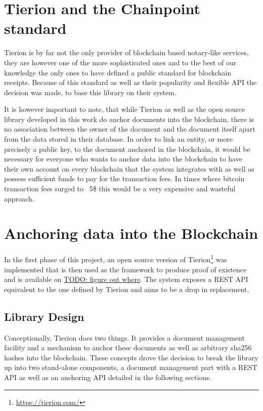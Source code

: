 \documentclass[12pt,msc,a4paper,oneside]{ucl_thesis}
\begin{document}
\section{Tierion and the Chainpoint standard}
Tierion is by far not the only provider of blockchain based notary-like services, they are however one of the more sophisticated ones and to the best of our knowledge the only ones to have defined a public standard for blockchain receipts. Because of this standard as well as their popularity and flexible API the decision was made, to base this library on their system.

It is however important to note, that while Tierion as well as the open source library developed in this work do anchor documents into the blockchain, there is no association between the owner of the document and the document itself apart from the data stored in their database. In order to link an entity, or more precisely a public key, to the document anchored in the blockchain, it would be necessary for everyone who wants to anchor data into the blockchain to have their own account on every blockchain that the system integrates with as well as possess sufficient funds to pay for the transaction fees. In times where bitcoin transaction fees surged to ~5\$ this would be a very expensive and wasteful approach.

\section{Anchoring data into the Blockchain} \label{sec:disclosure_anchor_data}
In the first phase of this project, an open source version of Tierion\footnote{\url{https://tierion.com/}} was implemented that is then used as the framework to produce proof of existence and is available on \url{TODO: figure out where}. The system exposes a REST API equivalent to the one defined by Tierion and aims to be a drop in replacement.


\subsection{Library Design}
Conceptionally, Tierion does two things. It provides a document management facility and a mechanism to anchor these documents as well as arbitrary sha256 hashes into the blockchain. These concepts drove the decision to break the library up into two stand-alone components, a document management part with a REST API as well as an anchoring API detailed in the following sections.
\end{document}

